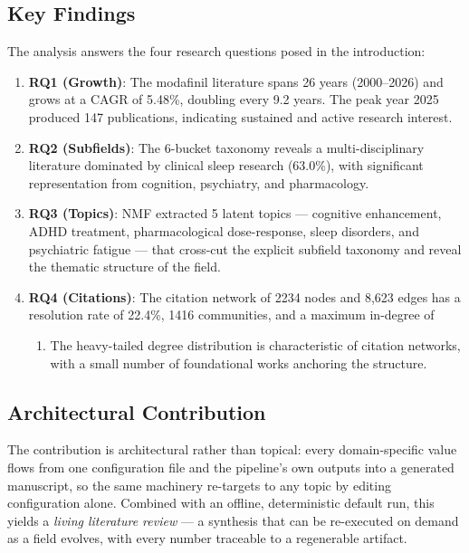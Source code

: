 \documentclass[
  english,
]{article}
\providecommand{\tightlist}{%
  \setlength{\itemsep}{0pt}\setlength{\parskip}{0pt}}
\begin{document}
\subsection{Key Findings}\label{key-findings}

The analysis answers the four research questions posed in the
introduction:

\begin{enumerate}
\def\labelenumi{\arabic{enumi}.}
\item
  \textbf{RQ1 (Growth)}: The modafinil literature spans 26 years
  (2000--2026) and grows at a CAGR of 5.48\%, doubling every 9.2 years.
  The peak year 2025 produced 147 publications, indicating sustained and
  active research interest.
\item
  \textbf{RQ2 (Subfields)}: The 6-bucket taxonomy reveals a
  multi-disciplinary literature dominated by clinical sleep research
  (63.0\%), with significant representation from cognition, psychiatry,
  and pharmacology.
\item
  \textbf{RQ3 (Topics)}: NMF extracted 5 latent topics --- cognitive
  enhancement, ADHD treatment, pharmacological dose-response, sleep
  disorders, and psychiatric fatigue --- that cross-cut the explicit
  subfield taxonomy and reveal the thematic structure of the field.
\item
  \textbf{RQ4 (Citations)}: The citation network of 2234 nodes and 8,623
  edges has a resolution rate of 22.4\%, 1416 communities, and a maximum
  in-degree of

  \begin{enumerate}
  \def\labelenumii{\arabic{enumii}.}
  \setcounter{enumii}{162}
  \tightlist
  \item
    The heavy-tailed degree distribution is characteristic of citation
    networks, with a small number of foundational works anchoring the
    structure.
  \end{enumerate}
\end{enumerate}

\subsection{Architectural
Contribution}\label{architectural-contribution}

The contribution is architectural rather than topical: every
domain-specific value flows from one configuration file and the
pipeline's own outputs into a generated manuscript, so the same
machinery re-targets to any topic by editing configuration alone.
Combined with an offline, deterministic default run, this yields a
\emph{living literature review} --- a synthesis that can be re-executed
on demand as a field evolves, with every number traceable to a
regenerable artifact.
\end{document}
